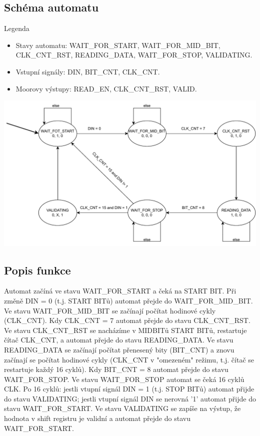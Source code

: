 \documentclass[a4paper, 11pt]{article}
\begin{document}
\subsection{Schéma automatu}
Legenda
\begin{itemize}
  \item Stavy automatu: WAIT\_FOR\_START, WAIT\_FOR\_MID\_BIT, CLK\_CNT\_RST, READING\_DATA, WAIT\_FOR\_STOP, VALIDATING.
  \item Vstupní signály: DIN, BIT\_CNT, CLK\_CNT.
  \item Moorovy výstupy: READ\_EN, CLK\_CNT\_RST, VALID.
\end{itemize}
\includegraphics[width=\textwidth,height=\textheight,keepaspectratio]{INC_FSM.pdf}
\subsection{Popis funkce}
Automat začíná ve stavu WAIT\_FOR\_START a čeká na START BIT. Při změně {DIN = 0} (t.j. START BITů) automat přejde do WAIT\_FOR\_MID\_BIT. Ve stavu WAIT\_FOR\_MID\_BIT se začínají počítat hodinové cykly (CLK\_CNT). Kdy CLK\_CNT = 7 automat přejde do stavu CLK\_CNT\_RST. Ve stavu CLK\_CNT\_RST se nacházíme v MIDBITů START BITů, restartuje čítač CLK\_CNT, a automat přejde do stavu READING\_DATA. Ve stavu READING\_DATA se začínají počítat přenesený bity (BIT\_CNT) a znovu začínají se počítat hodinové cykly  (CLK\_CNT v "omezeném" režimu, t.j. čítač se restartuje každý 16 cyklů). Kdy BIT\_CNT = 8 automat přejde do stavu WAIT\_FOR\_STOP. Ve stavu WAIT\_FOR\_STOP automat se čeká 16 cyklů CLK. Po 16 cyklů: jestli vtupní signál DIN = 1 (t.j. STOP BITů) automat přijde do stavu VALIDATING; jestli vtupní signál DIN se nerovná '1' automat přijde do stavu WAIT\_FOR\_START. Ve stavu VALIDATING se zapíše na výstup, že  hodnota v shift registru je validní a automat přejde do stavu WAIT\_FOR\_START.
\newpage
\end{document}
